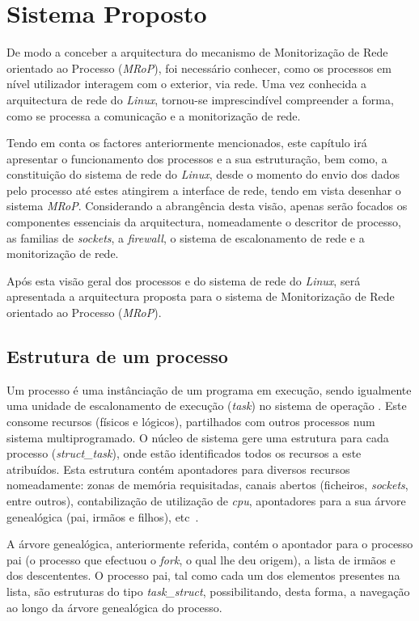 \chapter{Sistema Proposto}
\label{cap:Estrutura}

De modo a conceber a arquitectura do mecanismo de Monitorização de Rede orientado ao Processo (\textit{MRoP}), foi necessário conhecer, como os processos em nível utilizador interagem com o exterior, via rede.
Uma vez conhecida a arquitectura de rede do \textit{Linux}, tornou-se imprescindível compreender a forma, como se processa a comunicação e a monitorização de rede.

Tendo em conta os factores anteriormente mencionados, este capítulo irá apresentar o funcionamento dos processos e a sua estruturação, bem como, a constituição do sistema de rede do \textit{Linux}, desde o momento do envio dos dados pelo processo até estes atingirem a interface de rede, tendo em vista desenhar o sistema \textit{MRoP}.
Considerando a abrangência desta visão, apenas serão focados os componentes essenciais da arquitectura, nomeadamente o descritor de processo, as familias de \textit{sockets}, a \textit{firewall}, o sistema de escalonamento de rede e a monitorização de rede.

Após esta visão geral dos processos e do sistema de rede do \textit{Linux}, será apresentada a arquitectura proposta para o sistema de Monitorização de Rede orientado ao Processo (\textit{MRoP}).

\section{Estrutura de um processo}

Um processo é uma instânciação de um programa em execução, sendo igualmente uma unidade de escalonamento de execução (\textit{task}) no sistema de operação .
Este consome recursos (físicos e lógicos), partilhados com outros processos num sistema multiprogramado.
O núcleo de sistema gere uma estrutura para cada processo (\textit{struct\_task}), onde estão identificados todos os recursos a este atribuídos.
Esta estrutura contém apontadores para diversos recursos nomeadamente: zonas de memória requisitadas, canais abertos (ficheiros, \textit{sockets}, entre outros), contabilização de utilização de \textit{cpu}, apontadores para a sua árvore genealógica (pai, irmãos e filhos), etc~\cite{LKI, LKP}.

A árvore genealógica, anteriormente referida, contém o apontador para o processo pai (o processo que efectuou o \textit{fork}, o qual lhe deu origem), a lista de irmãos e dos descententes.
O processo pai, tal como cada um dos elementos presentes na lista, são estruturas do tipo \textit{task\_struct}, possibilitando, desta forma, a navegação ao longo da árvore genealógica do processo.

